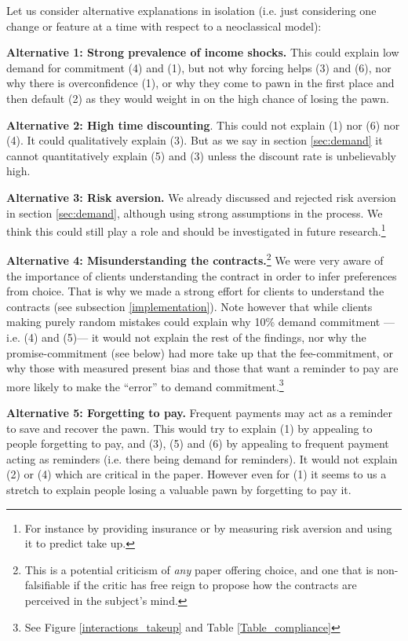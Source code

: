 \documentclass[oneside,11pt]{article}
\begin{document}
Let us consider alternative explanations in isolation (i.e. just considering one change or feature at a time with respect to a neoclassical model):

\vspace{.1in}
\noindent \textbf{Alternative 1: Strong prevalence of income shocks.} This could explain low demand for commitment (4) and (1), but not why forcing helps (3) and (6), nor why there is overconfidence (1), or why they come to pawn in the first place and then default (2) as they would weight in on the high chance of losing the pawn.


\vspace{.1in}
\noindent \textbf{Alternative 2: High time discounting}. This could not explain (1) nor (6) nor (4). It could qualitatively explain (3). But as we say in section \ref{sec:demand} it cannot quantitatively explain (5) and (3) unless the discount rate is unbelievably high.


\vspace{.1in}
\noindent \textbf{Alternative 3: Risk aversion.} We already discussed and rejected risk aversion in section \ref{sec:demand}, although using strong assumptions in the process. We think this could still play a role and should be investigated in future research.\footnote{For instance by  providing insurance or by measuring risk aversion and using it to predict take up.}

\vspace{.1in}
\noindent \textbf{Alternative 4: Misunderstanding the contracts.}\footnote{This is a potential criticism of \textit{any} paper offering choice, and one that is non-falsifiable if the critic has free reign to propose how the contracts are perceived in the subject's mind.} We were very aware of the importance of clients understanding the contract in order to infer preferences from choice. That is why we made a strong effort for clients to understand the contracts (see subsection \ref{implementation}). Note however that while clients making purely random mistakes could explain why 10\% demand commitment ---i.e. (4) and (5)--- it would not explain the rest of the findings, nor why the promise-commitment (see below) had more take up that the fee-commitment, or why those with measured present bias and those that want a reminder to pay are more likely to make the ``error'' to demand commitment.\footnote{See Figure \ref{interactions_takeup} and Table \ref{Table_compliance}} 

\vspace{.1in}
\noindent \textbf{Alternative 5: Forgetting to pay.} Frequent payments may act as a reminder to save and recover the pawn. This would try to explain (1) by appealing to people forgetting to pay, and (3), (5) and (6) by appealing to frequent payment acting as reminders (i.e. there being demand for reminders). It would not explain (2) or (4) which are critical in the paper. However even for (1) it seems to us a stretch to explain people losing a valuable pawn by forgetting to pay it. 
\end{document}
